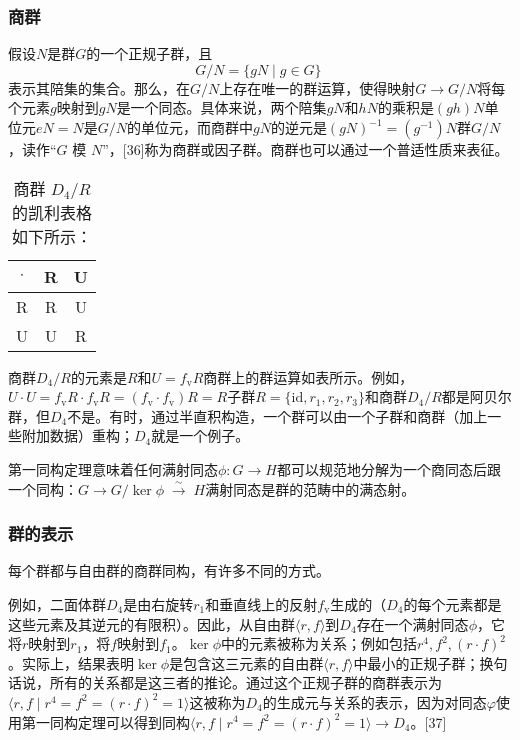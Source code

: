 \subsubsection{商群} 
假设\( N \)是群\( G \)的一个正规子群，且
\[G/N = \{gN \mid g \in G \}~\]
表示其陪集的集合。那么，在\( G/N \)上存在唯一的群运算，使得映射\(G \to G/N\)将每个元素\( g \)映射到\( gN \)是一个同态。具体来说，两个陪集\( gN \)和\( hN \)的乘积是\((gh)N\)单位元\( eN = N \)是\( G/N \)的单位元，而商群中\(gN\)的逆元是\((gN)^{-1} = (g^{-1})N\)群\( G/N \)，读作“\( G \) 模 \( N \)”，[36]称为商群或因子群。商群也可以通过一个普适性质来表征。
\begin{table}[ht]
\centering
\caption{商群 \( D_4 / R \) 的凯利表格如下所示：}\label{GroupM}
\begin{tabular}{|c|c|c}
\hline
\(\cdot\) & R & U \\
\hline
R & R & U \\
\hline
U & U & R \\
\hline 
\end{tabular}
\end{table}
商群\( D_4 / R \)的元素是\( R \)和\(U = f_{\mathrm{v}} R\)商群上的群运算如表所示。例如，\(U \cdot U = f_{\mathrm{v}} R \cdot f_{\mathrm{v}} R =(f_{\mathrm{v}}\cdot f_{\mathrm{v}}) R = R\)子群\(R =\{\text{id}, r_1, r_2, r_3\}\)和商群\( D_4 / R \)都是阿贝尔群，但\(D_4\)不是。有时，通过半直积构造，一个群可以由一个子群和商群（加上一些附加数据）重构；\(D_4\)就是一个例子。

第一同构定理意味着任何满射同态\(\phi: G \to H\)都可以规范地分解为一个商同态后跟一个同构：\(G \to G / \ker \phi \; {\stackrel {\sim}{\to}} \; H\)满射同态是群的范畴中的满态射。
\subsubsection{群的表示}  
每个群都与自由群的商群同构，有许多不同的方式。

例如，二面体群\(D_4\)是由右旋转\(r_1\)和垂直线上的反射\(f_{\mathrm{v}}\)生成的（\(D_4\)的每个元素都是这些元素及其逆元的有限积）。因此，从自由群\( \langle r, f \rangle \)到\(D_4\)存在一个满射同态\(\phi\)，它将\(r\)映射到\(r_1\)，将\(f\)映射到\(f_1\)。\(\ker \phi\)中的元素被称为关系；例如包括\( r^4, f^2, (r\cdot f)^2\)。实际上，结果表明\(\ker \phi\)是包含这三元素的自由群\(\langle r, f \rangle\)中最小的正规子群；换句话说，所有的关系都是这三者的推论。通过这个正规子群的商群表示为\(\langle r, f \mid r^4 = f^2 = (r \cdot f)^2 = 1 \rangle\)这被称为\(D_4\)的生成元与关系的表示，因为对同态\(\varphi\)使用第一同构定理可以得到同构\(\langle r, f \mid r^4 = f^2 = (r \cdot f)^2 = 1 \rangle \to D_4\)。[37]

